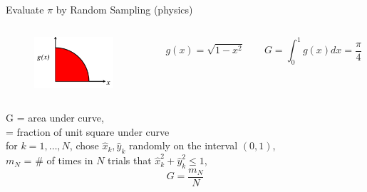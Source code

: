 \documentclass[xcolor=x11names,compress]{beamer}
\renewcommand{\(}{\begin{columns}}
\renewcommand{\)}{\end{columns}}
\newcommand{\<}[1]{\begin{column}{#1}}
\renewcommand{\>}{\end{column}}
\begin{document}
\begin{frame}{Evaluate $\pi$ by Random Sampling (physics)}

\begin{columns}
  \begin{column}{0.3\textwidth}
  	\begin{figure}
  	\begin{center}
  		\includegraphics[height=0.75in,clip]{quarter-circle}
	\end{center}
  	\end{figure}
  \end{column}
  \begin{column}{0.7\textwidth}
    \begin{equation}
      g(x) = \sqrt{1 - x^2}	\qquad G = \int_0^1 g(x)dx = \frac{\pi}{4} \nonumber
    \end{equation}
  \end{column}
\end{columns}
\pause
\vspace*{0.5em}
G = area under curve, \\
\hspace*{0.75 em} = fraction of unit square under curve\\
\vspace*{0.5em}
\hspace*{2 em}for $k = 1, \dots, N$, chose $\hat{x}_k, \hat{y}_k$ randomly on the interval $(0,1)$,\\
\vspace*{0.5em}
$m_N$ = $\#$ of times in $N$ trials that $\hat{x}_k^2 + \hat{y}_k^2 \leq 1$,
\[G = \frac{m_N}{N}\]

\end{frame}
\end{document}

